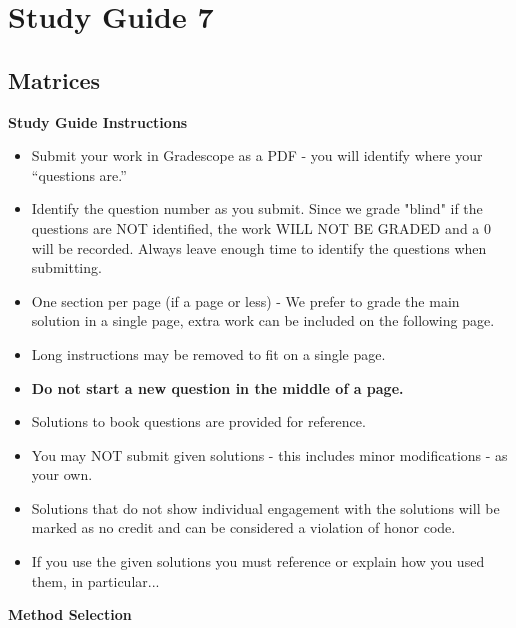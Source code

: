 \clearpage
\chapter{Study Guide 7}

\section{Matrices}

\begin{center}
    \large{\textbf{Study Guide Instructions}}
\end{center}


\begin{itemize}
    \item Submit your work in Gradescope as a PDF - you will identify where your “questions are.”
    \item Identify the question number as you submit.  Since we grade "blind" if the questions are NOT identified, the work WILL NOT BE GRADED and a 0 will be recorded. Always leave enough time to 
    identify the questions when submitting.
    \item One section per page (if a page or less) - We prefer to grade the main solution in a single page, extra work can be included on the following page.
    \item Long instructions may be removed to fit on a single page.
    \item \textbf{Do not start a new question in the middle of a page.}
    \item Solutions to book questions are provided for reference.
    \item You may NOT submit given solutions - this includes minor modifications - as your own.
    \item Solutions that do not show individual engagement with the solutions will be marked as no credit and can be considered a violation of honor code.
    \item If you use the given solutions you must reference or explain how you used them, in particular...
\end{itemize}


\begin{center}
    \large{\textbf{Method Selection}}
\end{center}



